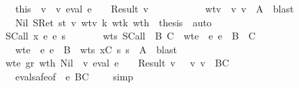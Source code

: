 \begin{isabellebody}
\ \ \ \ \ \ \ \ \isamarkupfalse \ this\ \isamarkupfalse \ v\ \ v{\isacharcolon}\ {\isachardoublequoteopen}eval\ e\ {\isasymrho}\ {\isasymmu}\ {\isacharequal}\ Result\ v{\isachardoublequoteclose}\isanewline
\ \ \ \ \ \ \ \ \ \ \ wtv{\isacharcolon}\ {\isachardoublequoteopen}{\isasymSigma}\ {\isasymturnstile}v\ v\ {\isacharcolon}\ A{\isacharprime}{\isachardoublequoteclose}\ \isamarkupfalse \ blast\isanewline
\ \ \ \ \ \ \ \ \isamarkupfalse \ Nil\ SRet\ st\ v\ wtv\ k\ wt{\isacharunderscore}k\ wt{\isacharunderscore}h\ \isamarkupfalse \ {\isacharquery}thesis\ \isamarkupfalse \ auto\isanewline
\ \ \ \ \ \ \isamarkupfalse \isanewline
\ \ \ \ \isamarkupfalse \isanewline
\ \ \ \ \ \ \isamarkupfalse \ {\isacharparenleft}SCall\ x\ e{}\ e{}\ s{}{\isacharparenright}\isanewline
\ \ \ \ \ \ \isamarkupfalse \ wts\ SCall\ \isamarkupfalse \ B\ C\ \ wte{}{\isacharcolon}\ {\isachardoublequoteopen}{\isasymGamma}\ {\isasymturnstile}\isactrlisub e\ e{}\ {\isacharcolon}\ B\ {\isasymrightarrow}\ C{\isachardoublequoteclose}\ \isanewline
\ \ \ \ \ \ \ \ \ wte{}{\isacharcolon}\ {\isachardoublequoteopen}{\isasymGamma}\ {\isasymturnstile}\isactrlisub e\ e{}\ {\isacharcolon}\ B{\isachardoublequoteclose}\ \ wts{}{\isacharcolon}\ {\isachardoublequoteopen}{\isacharparenleft}x{\isacharcomma}C{\isacharparenright}{\isacharhash}{\isasymGamma}\ {\isasymturnstile}\isactrlisub s\ s{}\ {\isacharcolon}\ A{\isacharprime}{\isachardoublequoteclose}\ \isamarkupfalse \ blast\isanewline
\ \ \ \ \ \ \isamarkupfalse \ wte{}\ gr\ wt{\isacharunderscore}h\ Nil\ \isamarkupfalse \ {\isachardoublequoteopen}{\isacharparenleft}{\isasymexists}v{}{\isachardot}\ eval\ e{}\ {\isasymrho}\ {\isasymmu}\ {\isacharequal}\ Result\ v{}\ {\isasymand}\ {\isasymSigma}\ {\isasymturnstile}v\ v{}\ {\isacharcolon}\ B{\isasymrightarrow}C{\isacharparenright}{\isachardoublequoteclose}\isanewline
\ \ \ \ \ \ \ \ \isamarkupfalse \ eval{\isacharunderscore}safe{\isacharbrackleft}of\ {\isasymGamma}\ e{}\ {\isachardoublequoteopen}B{\isasymrightarrow}C{\isachardoublequoteclose}\ {\isasymSigma}\ {\isasymrho}\ {\isasymmu}{\isacharbrackright}\ \isamarkupfalse \ simp\isanewline

\end{isabellebody}
